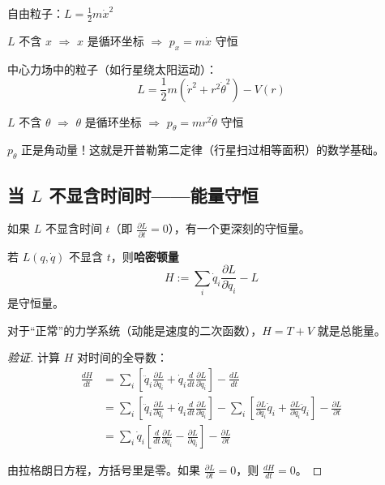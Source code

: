 \begin{example}
自由粒子：$L = \frac{1}{2}m\dot{x}^2$

$L$ 不含 $x$ $\Rightarrow$ $x$ 是循环坐标 $\Rightarrow$ $p_x = m\dot{x}$ 守恒
\end{example}

\begin{example}
中心力场中的粒子（如行星绕太阳运动）：
\[
L = \frac{1}{2}m(\dot{r}^2 + r^2\dot{\theta}^2) - V(r)
\]

$L$ 不含 $\theta$ $\Rightarrow$ $\theta$ 是循环坐标 $\Rightarrow$ $p_\theta = mr^2\dot{\theta}$ 守恒

$p_\theta$ 正是角动量！这就是开普勒第二定律（行星扫过相等面积）的数学基础。
\end{example}

\subsection{当 $L$ 不显含时间时——能量守恒}

如果 $L$ 不显含时间 $t$（即 $\frac{\partial L}{\partial t} = 0$），有一个更深刻的守恒量。

\begin{keytheorem}[title=能量守恒]
若 $L(q, \dot{q})$ 不显含 $t$，则\textbf{哈密顿量}
\begin{equation}
H := \sum_i \dot{q}_i \frac{\partial L}{\partial \dot{q}_i} - L
\end{equation}
是守恒量。

对于“正常”的力学系统（动能是速度的二次函数），$H = T + V$ 就是总能量。
\end{keytheorem}

\begin{proof}[验证]
计算 $H$ 对时间的全导数：
\begin{align}
\frac{dH}{dt} &= \sum_i \left[ \ddot{q}_i \frac{\partial L}{\partial \dot{q}_i} + \dot{q}_i \frac{d}{dt}\frac{\partial L}{\partial \dot{q}_i} \right] - \frac{dL}{dt} \\
&= \sum_i \left[ \ddot{q}_i \frac{\partial L}{\partial \dot{q}_i} + \dot{q}_i \frac{d}{dt}\frac{\partial L}{\partial \dot{q}_i} \right] - \sum_i \left[ \frac{\partial L}{\partial q_i}\dot{q}_i + \frac{\partial L}{\partial \dot{q}_i}\ddot{q}_i \right] - \frac{\partial L}{\partial t} \\
&= \sum_i \dot{q}_i \left[ \frac{d}{dt}\frac{\partial L}{\partial \dot{q}_i} - \frac{\partial L}{\partial q_i} \right] - \frac{\partial L}{\partial t}
\end{align}

由拉格朗日方程，方括号里是零。如果 $\frac{\partial L}{\partial t} = 0$，则 $\frac{dH}{dt} = 0$。
\end{proof}

